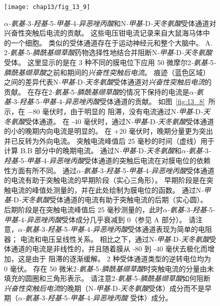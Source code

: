 \begin{figure}[htbp]
	\centering
	\texttt{[image: chap13/fig\_13\_9]}
	\caption{\textit{$\alpha$-氨基-}3\textit{-羟基-}5\textit{-甲基-}4\textit{-异恶唑丙酸}和N\textit{-甲基-}D\textit{-天冬氨酸}受体通道对兴奋性突触后电流的贡献。
		这些电压钳电流记录来自大鼠海马体中的一个细胞。
		类似的受体通道存在于运动神经元和整个大脑中\cite{hestrin1990analysis}。
	A. 2\textit{-氨基-}5\textit{-膦酰基缬草酸}药物选择性地结合并阻断N\textit{-甲基-}D\textit{-天冬氨酸}受体。
	这里显示的是在 3 种不同的膜电位下应用 50 微摩尔2\textit{-氨基-}5\textit{-膦酰基缬草酸}之前和期间的\textit{兴奋性突触后电流}。
	痕迹（蓝色区域）之间的差异代表N\textit{-甲基-}D\textit{-天冬氨酸}受体通道对\textit{兴奋性突触后电流}的贡献。
	在存在2\textit{-氨基-}5\textit{-膦酰基缬草酸}的情况下保持的电流是\textit{$\alpha$-氨基-}3\textit{-羟基-}5\textit{-甲基-}4\textit{-异恶唑丙酸}受体通道的贡献。
	如图~\ref{fig:13_8}~所示，在 −80 毫伏时，由于明显的  阻滞，没有电流通过N\textit{-甲基-}D\textit{-天冬氨酸}受体通道。
	在 -40 毫伏时，通过N\textit{-甲基-}D\textit{-天冬氨酸}受体通道的小的晚期内向电流是明显的。 
	在 +20 毫伏时，晚期分量更为突出并已反转为外向电流。
	突触电流峰值后 25 毫秒的时间（虚线）用于计算 B.B 部分中的晚期电流。
	通过N\textit{-甲基-}D\textit{-天冬氨酸}和\textit{$\alpha$-氨基-}3\textit{-羟基-}5\textit{-甲基-}4\textit{-异恶唑丙酸}受体通道的突触后电流在对膜电位的依赖性方面有所不同。
	通过\textit{$\alpha$-氨基-}3\textit{-羟基-}5\textit{-甲基-}4\textit{-异恶唑丙酸}受体通道的电流有助于突触电流的早期阶段（实心三角形）。
	早期阶段是在突触电流的峰值处测量的，并在此处绘制为膜电位的函数。
	通过N\textit{-甲基-}D\textit{-天冬氨酸}受体通道的电流有助于突触电流的后期（实心圆）。
	后期阶段是在突触电流峰值后 25 毫秒测量的，此时\textit{$\alpha$-氨基-}3\textit{-羟基-}5\textit{-甲基-}4\textit{-异恶唑丙酸}受体成分几乎衰减到 0（参见 A 部分）。
	请注意，\textit{$\alpha$-氨基-}3\textit{-羟基-}5\textit{-甲基-}4\textit{-异恶唑丙酸}受体通道表现为简单的电阻器；
	电流和电压呈线性关系。
	相比之下，通过N\textit{-甲基-}D\textit{-天冬氨酸}受体通道的电流是非线性的，并且随着膜从 -80 到 -40 毫伏去极化而增加，这是由于  阻滞的逐渐缓解。
	2 种受体通道类型的逆转电位均为 0 毫伏。
	存在 50 微米2\textit{-氨基-}5\textit{-膦酰基缬草酸}时突触电流的分量由未填充的圆圈和三角形表示。
	请注意2\textit{-氨基-}5\textit{-膦酰基缬草酸}如何阻断\textit{兴奋性突触后电流}的晚期（N\textit{-甲基-}D\textit{-天冬氨酸}受体）成分而不是早期（\textit{$\alpha$-氨基-}3\textit{-羟基-}5\textit{-甲基-}4\textit{-异恶唑丙酸} 受体）成分。}
	\label{fig:13_9}
\end{figure}


